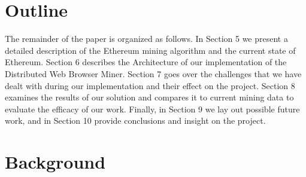 \documentclass[10pt, conference, compsocconf]{IEEEtran}
\begin{document}
\section{Outline}
The remainder of the paper is organized as follows. In Section 5 we present a detailed description of the Ethereum mining algorithm and the current state of Ethereum. Section 6 describes the Architecture of our implementation of the Distributed Web Browser Miner. Section 7 goes over the challenges that we have dealt with during our implementation and their effect on the project. Section 8 examines the results of our solution and compares it to current mining data to evaluate the efficacy of our work. Finally, in Section 9 we lay out possible future work, and in Section 10 provide conclusions and insight on the project.



\section{Background}
\end{document}
